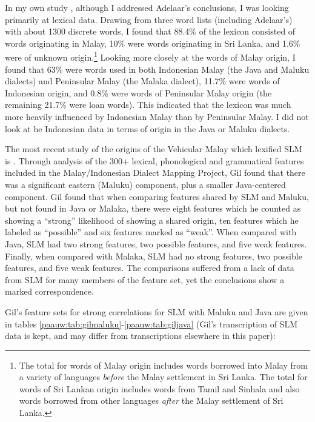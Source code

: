 In my own study \citep{Paauw2004}, although I addressed Adelaar's conclusions, I was looking primarily at lexical data. Drawing from three word lists (including Adelaar's) with about 1300 discrete words, I found that 88.4\% of the lexicon consisted of words originating in Malay, 10\% were words originating in Sri Lanka, and 1.6\% were of unknown origin.\footnote{The
 total for words of Malay origin includes words borrowed into Malay from a variety of languages \textit{before} the Malay settlement in Sri Lanka. The total for words of Sri Lankan origin includes words from Tamil and Sinhala and also words borrowed from other languages \textit{after} the Malay settlement of Sri Lanka.
} 
Looking more closely at the words of Malay origin, I found that 63\% were words used in both Indonesian Malay (the Java and Maluku dialects) and Peninsular Malay (the Malaka dialect), 11.7\% were words of Indonesian origin, and 0.8\% were words of Peninsular Malay origin (the remaining 21.7\% were loan words).  This indicated that the lexicon was much more heavily influenced by Indonesian Malay than by Peninsular Malay. I did not look at he Indonesian data in terms of origin in the Java or Maluku dialects.

The most recent study of the origins of the Vehicular Malay which lexified SLM is \citet{Gil2010}.  Through analysis of the 300+ lexical, phonological and grammatical features included in the Malay/Indonesian Dialect Mapping Project, Gil found that there was a significant eastern (Maluku) component, plus a smaller Java-centered component. Gil found that when comparing features shared by SLM and Maluku, but not found in Java or Malaka, there were eight features which he counted as showing a ``strong'' likelihood of showing a shared origin, ten features which he labeled as ``possible'' and six features marked as ``weak''. When compared with Java, SLM had two strong features, two possible features, and five weak features. Finally, when compared with Malaka, SLM had no strong features, two possible features, and five weak features. The comparisons suffered from a lack of data from SLM for many members of the feature set, yet the conclusions show a marked correspondence.

Gil's feature sets for strong correlations for SLM with Maluku and Java are given in tables \ref{paauw:tab:gilmaluku}-\ref{paauw:tab:giljava} (Gil's transcription of SLM data is kept, and may differ from transcriptions elsewhere in this paper):


